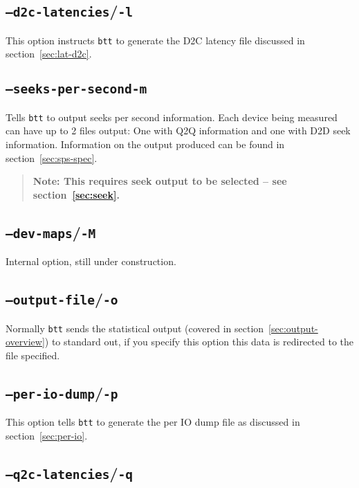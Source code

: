 \documentclass{article}
\begin{document}
\subsection{\label{sec:o-l}\texttt{--d2c-latencies}/\texttt{-l}}

  This option instructs \texttt{btt} to generate the D2C latency file
  discussed in section~\ref{sec:lat-d2c}.

\subsection{\label{sec:o-m}\texttt{--seeks-per-second}\texttt{-m}}

  Tells \texttt{btt} to output seeks per second information.  Each device
  being measured can have up to 2 files output: One with Q2Q information
  and one with D2D seek information. Information on the output produced
  can be found in section~\ref{sec:sps-spec}.

  \begin{quote}
    \textbf{Note: This requires seek output to be selected -- see
    section~\ref{sec:seek}.}
  \end{quote}

\subsection{\label{sec:o-M}\texttt{--dev-maps}/\texttt{-M}}

  Internal option, still under construction.

\subsection{\label{sec:o-o}\texttt{--output-file}/\texttt{-o}}

  Normally \texttt{btt} sends the statistical output (covered in
  section~\ref{sec:output-overview}) to standard out, if you specify
  this option this data is redirected to the file specified.

\subsection{\label{sec:o-p}\texttt{--per-io-dump}/\texttt{-p}}

  This option tells \texttt{btt} to generate the per IO dump file as
  discussed in section~\ref{sec:per-io}.

\subsection{\label{sec:o-q}\texttt{--q2c-latencies}/\texttt{-q}}
\end{document}
